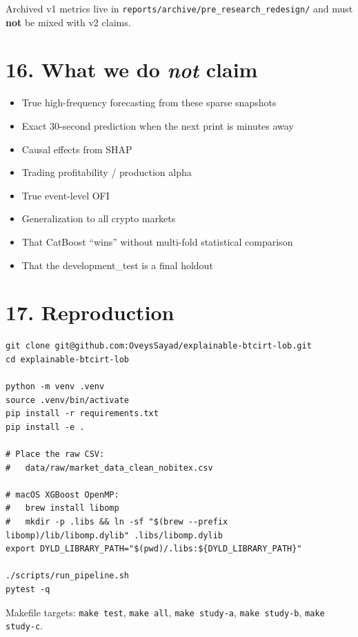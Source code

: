 \documentclass[11pt,a4paper]{article}
\begin{document}
Archived v1 metrics live in \texttt{reports/archive/pre\_research\_redesign/} and must \textbf{not} be mixed with v2 claims.


\vspace{0.5em}

\section{16. What we do \textit{not} claim}

\begin{itemize}
\item True high-frequency forecasting from these sparse snapshots  
\item Exact 30-second prediction when the next print is minutes away  
\item Causal effects from SHAP  
\item Trading profitability / production alpha  
\item True event-level OFI  
\item Generalization to all crypto markets  
\item That CatBoost ``wins'' without multi-fold statistical comparison  
\item That the development\_test is a final holdout  
\end{itemize}

\vspace{0.5em}

\section{17. Reproduction}

\begin{verbatim}
git clone git@github.com:OveysSayad/explainable-btcirt-lob.git
cd explainable-btcirt-lob

python -m venv .venv
source .venv/bin/activate
pip install -r requirements.txt
pip install -e .

# Place the raw CSV:
#   data/raw/market_data_clean_nobitex.csv

# macOS XGBoost OpenMP:
#   brew install libomp
#   mkdir -p .libs && ln -sf "$(brew --prefix libomp)/lib/libomp.dylib" .libs/libomp.dylib
export DYLD_LIBRARY_PATH="$(pwd)/.libs:${DYLD_LIBRARY_PATH}"

./scripts/run_pipeline.sh
pytest -q
\end{verbatim}

Makefile targets: \texttt{make test}, \texttt{make all}, \texttt{make study-a}, \texttt{make study-b}, \texttt{make study-c}.
\end{document}
